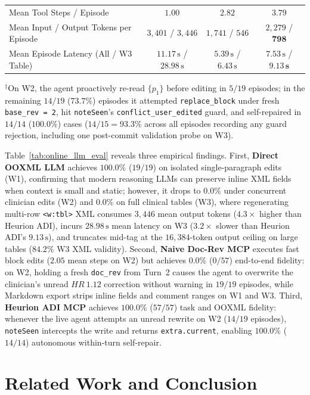 \documentclass[11pt,a4paper]{article}
\begin{document}
\begin{table}[!t]
{\begin{tabular}{@{}lccc@{}}
\midrule
Mean Tool Steps / Episode & $1.00$ & $2.82$ & $3.79$ \\
Mean Input / Output Tokens per Episode & $3{,}401$ / $3{,}446$ & $1{,}741$ / $546$ & $2{,}279$ / $\mathbf{798}$ \\
Mean Episode Latency (All / W3 Table) & $11.17\,\text{s}$ / $28.98\,\text{s}$ & $5.39\,\text{s}$ / $6.43\,\text{s}$ & $7.53\,\text{s}$ / $\mathbf{9.13\,\text{s}}$ \\
\bottomrule
\end{tabular}
}
\vspace{2pt}
\raggedright\footnotesize $^\ddagger$On W2, the agent proactively re-read $\{p_1\}$ before editing in $5/19$ episodes; in the remaining $14/19$ ($73.7\%$) episodes it attempted \texttt{replace\_block} under fresh \texttt{base\_rev = 2}, hit \texttt{noteSeen}'s \texttt{conflict\_user\_edited} guard, and self-repaired in $14/14$ ($100.0\%$) cases ($14/15 = 93.3\%$ across all episodes recording any guard rejection, including one post-commit validation probe on W3).
\end{table}

Table~\ref{tab:online_llm_eval} reveals three empirical findings. First, \textbf{Direct OOXML LLM} achieves $100.0\%$ ($19/19$) on isolated single-paragraph edits (W1), confirming that modern reasoning LLMs can preserve inline XML fields when context is small and static; however, it drops to $0.0\%$ under concurrent clinician edits (W2) and $0.0\%$ on full clinical tables (W3), where regenerating multi-row \texttt{<w:tbl>} XML consumes $3{,}446$ mean output tokens ($4.3\times$ higher than Heurion ADI), incurs $28.98\,\text{s}$ mean latency on W3 ($3.2\times$ slower than Heurion ADI's $9.13\,\text{s}$), and truncates mid-tag at the $16{,}384$-token output ceiling on large tables ($84.2\%$ W3 XML validity). Second, \textbf{Naive Doc-Rev MCP} executes fast block edits ($2.05$ mean steps on W2) but achieves $0.0\%$ ($0/57$) end-to-end fidelity: on W2, holding a fresh \texttt{doc\_rev} from Turn~2 causes the agent to overwrite the clinician's unread $HR~1.12$ correction without warning in $19/19$ episodes, while Markdown export strips inline fields and comment ranges on W1 and W3. Third, \textbf{Heurion ADI MCP} achieves $100.0\%$ ($57/57$) task and OOXML fidelity: whenever the live agent attempts an unread rewrite on W2 ($14/19$ episodes), \texttt{noteSeen} intercepts the write and returns \texttt{extra.current}, enabling $100.0\%$ ($14/14$) autonomous within-turn self-repair.

\section{Related Work and Conclusion}
\label{sec:related_conclusion}
\end{document}
